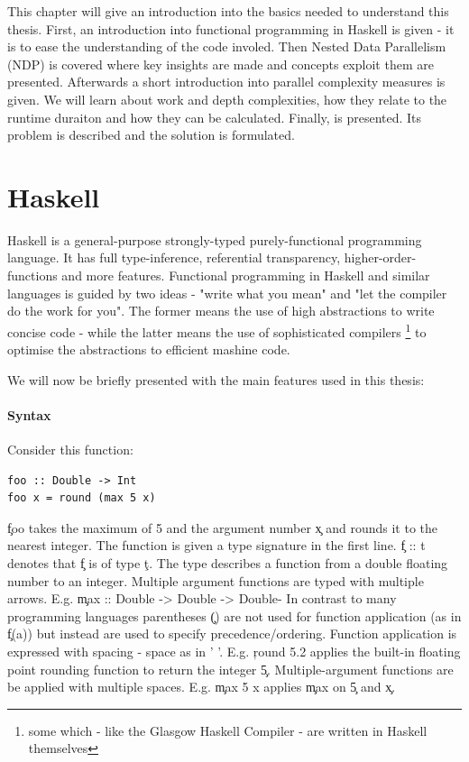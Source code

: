 

This chapter will give an introduction into the basics needed to
understand this thesis. First, an introduction into functional programming
in Haskell is given - it is to ease the understanding of the code involed.
Then Nested Data Parallelism (NDP) is covered where
key insights are made and concepts exploit them are presented.
Afterwards a short introduction into parallel complexity measures is given.
We will learn about work and depth complexities, how they relate
to the runtime duraiton and how they can be calculated.
Finally, \algo is presented. Its problem is described and
the solution is formulated.

\section{Haskell}
  Haskell is a general-purpose strongly-typed purely-functional programming
  language. It has full type-inference, referential transparency, higher-order-functions
  and more features. Functional programming in Haskell and similar languages
  is guided by two ideas - "write what you mean" and "let the compiler do the work for you".
  The former means the use of high abstractions to write concise code -
  while the latter means the use of sophisticated compilers
  \footnote{some which - like the Glasgow Haskell Compiler - are written in Haskell themselves}
  to optimise the abstractions to efficient mashine code.
  
  We will now be briefly presented with the main features used in this thesis:
  \paragraph{Syntax}
  Consider this function:
  \begin{lstlisting}
foo :: Double -> Int
foo x = round (max 5 x)
  \end{lstlisting}
  \c{foo} takes the maximum of 5 and the argument number \c{x} and
  rounds it to the nearest integer. The function is given a type
  signature in the first line. \c{f :: t} denotes that \c{f} is of type \c{t}.
  The type describes a function from a double floating number
  to an integer. Multiple argument functions are typed with multiple arrows.
  E.g. \c{max :: Double -> Double -> Double}-
  In contrast to many programming languages parentheses \c{()} are not used for function application
  (as in \c{f(a)}) but instead are used to specify precedence/ordering.
  Function application is expressed with spacing - space as in ' '. E.g. \c{round 5.2} applies the built-in
  floating point rounding function to return the integer \c{5}. Multiple-argument
  functions are be applied with multiple spaces. E.g. \c{max 5 x}
  applies \c{max} on \c{5} and \c{x}.
  
